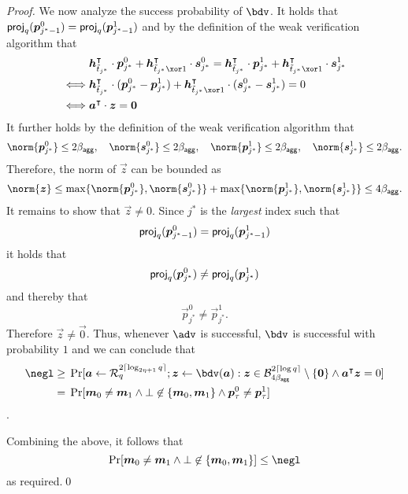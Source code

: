 \begin{proof}
  We now analyze the success probability of $\bdv$.
  It holds that $\mathsf{proj}_q(\boldsymbol{p}_{j^*-1}^0) = \mathsf{proj}_q(\boldsymbol{p}_{j^*-1}^1)$ and by the definition of the weak verification algorithm that
  \begin{align*}
    &\vec{h}_{\tilde t_{j^*}}^\intercal\cdot\vec{p}_{j^*}^0 + \vec{h}_{\tilde t_{j^*}\xor 1}^\intercal\cdot\vec{s}_{j^*}^0 = \vec{h}_{\tilde t_{j^*}}^\intercal\cdot\vec{p}_{j^*}^1 + \vec{h}_{\tilde t_{j^*}\xor 1}^\intercal\cdot\vec{s}_{j^*}^1\\
    \iff&\vec{h}_{\tilde t_{j^*}}^\intercal\cdot(\vec{p}_{j^*}^0-\vec{p}_{j^*}^1) + \vec{h}_{\tilde t_{j^*}\xor 1}^\intercal\cdot(\vec{s}_{j^*}^0-\vec{s}_{j^*}^1) = 0\\
    \iff&\vec{a}^\intercal\cdot\vec{z}=\vec{0} 
  \end{align*}
  It further holds by the definition of the weak verification algorithm that 
  \[\norm{\vec{p}_{j^*}^0} \leq 2\bagg,\quad \norm{\vec{s}_{j^*}^0} \leq 2\bagg, \quad\norm{\vec{p}_{j^*}^1} \leq 2\bagg, \quad \norm{\vec{s}_{j^*}^1} \leq 2\bagg.\]
  Therefore, the norm of $\vec{z}$ can be bounded as \[\norm{\vec{z}} \leq \max\{\norm{\vec{p}_{j^*}^0},\norm{\vec{s}_{j^*}^0}\}+\max\{\norm{\vec{p}_{j^*}^1},\norm{\vec{s}_{j^*}^1}\} \leq 4\bagg.\]
  It remains to show that $\vec{z}\neq 0$.
  Since $j^*$ is the \emph{largest} index such that 
  \[
    \mathsf{proj}_q(\boldsymbol{p}_{j^*-1}^0) = \mathsf{proj}_q(\boldsymbol{p}_{j^*-1}^1)
  \]
  it holds that
  \[
    \mathsf{proj}_q(\boldsymbol{p}_{j^*}^0) \neq \mathsf{proj}_q(\boldsymbol{p}_{j^*}^1)
  \]
  and thereby that
  \[
    \vec{p}_{j^*}^0 \neq \vec{p}_{j^*}^1.
  \]
  Therefore $\vec{z}\neq\vec{0}$.
  Thus, whenever $\adv$ is successful, $\bdv$ is successful with probability $1$ and we can conclude that
  \begin{align*}
  \negl \geq{}& \Pr[
      \vec{a} \gets \ring_q^{2\lceil\log_{2\eta+1} q\rceil}; \vec{z}\gets\bdv(\vec{a}) : \vec{z}\in\ball_{4\bagg}^{2\lceil\log q\rceil}\setminus\{\vec{0}\} \land \vec{a}^\intercal\vec{z}=0
    ]\\
    ={}&
    \Pr[\vec{m}_0\neq \vec{m}_1 \land \bot\not\in\{\vec{m}_0,\vec{m}_1\} \land \vec{p}_\tau^0 \neq \vec{p}_\tau^1]
  \end{align*}.
  
  Combining the above, it follows that
  \[
    \Pr[\vec{m}_0\neq \vec{m}_1 \land \bot\not\in\{\vec{m}_0,\vec{m}_1\}] \leq \negl
  \]
  as required.\qed
\end{proof}


